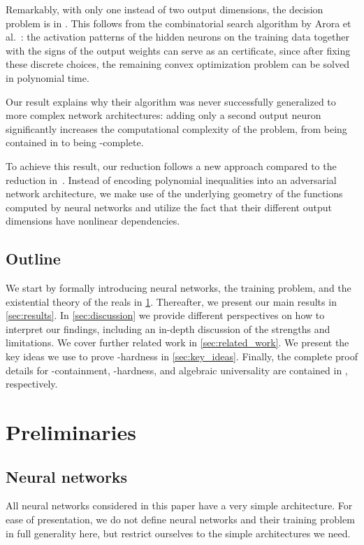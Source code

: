 \documentclass{toc}
\begin{document}
Remarkably, with only one instead of two output dimensions, the
%
decision
%
problem is in \NP.
%
%
%
%
%
This follows from the combinatorial search algorithm by Arora et al.~\cite{Arora2018_Understanding}: the activation patterns of the hidden neurons on the training data together with the signs of the output weights can serve as an \NP{} certificate, since after fixing these discrete choices, the remaining convex optimization problem can be solved in polynomial time.
%

%
Our result explains why their algorithm was never successfully generalized to more complex network
architectures: adding only a second output neuron significantly increases the computational
complexity of the problem, from being contained in \NP{} to being \ER-complete.

To achieve this result, our reduction follows a %
%
%
%
new  %
approach compared to the reduction in~\cite{Abrahamsen2021_NeuralNetworks}.
%
%
Instead of encoding polynomial inequalities into an adversarial network architecture, we make use of the underlying geometry of the functions computed by \twolayer neural networks and utilize the fact that their different output dimensions have nonlinear dependencies.

\subsection{Outline}
We start by formally introducing neural networks, the training problem, and the existential theory of the reals in \cref{sec:preliminaries}.
Thereafter, we present our main results in \cref{sec:results}.
In \cref{sec:discussion} we provide different perspectives on how to interpret our findings, including an in-depth discussion of the strengths and limitations.
We cover further related work in \cref{sec:related_work}.
We present the key ideas we use to prove \ER-hardness in \cref{sec:key_ideas}.
Finally, the complete proof details for \ER-containment, \ER-hardness, and algebraic universality are contained in , respectively.



\section{Preliminaries}
\label{sec:preliminaries}

\subsection{Neural networks}
All neural networks considered in this paper have a very simple architecture.
For ease of presentation, we do not define neural networks and their training problem in full generality here, but restrict ourselves to the simple architectures we need.
\end{document}
